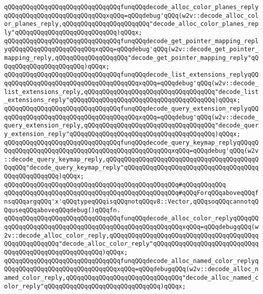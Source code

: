 \verb|qQQqqQQqqQQqqQQqqQQqqQQqqQQqqQQqfunqQQqdecode_alloc_color_planes_replyqQQqqQQqqQQqqQQqqQQqqQQqqQQqxqQQq=qQQqdebug'qQQq(w2v::decode_alloc_color_planes_reply,qQQqqQQqqQQqqQQqqQQqqQQq"decode_alloc_color_planes_reply"qQQqqQQqqQQqqQQqqQQqqQQqqQQq)qQQqx;|\newline
\verb|qQQqqQQqqQQqqQQqqQQqqQQqqQQqqQQqfunqQQqdecode_get_pointer_mapping_replyqQQqqQQqqQQqqQQqqQQqqQQqxqQQq=qQQqdebug'qQQq(w2v::decode_get_pointer_mapping_reply,qQQqqQQqqQQqqQQqqQQq"decode_get_pointer_mapping_reply"qQQqqQQqqQQqqQQqqQQqqQQq)qQQqx;|\newline
\verb|qQQqqQQqqQQqqQQqqQQqqQQqqQQqqQQqfunqQQqdecode_list_extensions_replyqQQqqQQqqQQqqQQqqQQqqQQqqQQqqQQqqQQqqQQqxqQQq=qQQqdebug'qQQq(w2v::decode_list_extensions_reply,qQQqqQQqqQQqqQQqqQQqqQQqqQQqqQQqqQQq"decode_list_extensions_reply"qQQqqQQqqQQqqQQqqQQqqQQqqQQqqQQqqQQqqQQq)qQQqx;|\newline
\verb|qQQqqQQqqQQqqQQqqQQqqQQqqQQqqQQqfunqQQqdecode_query_extension_replyqQQqqQQqqQQqqQQqqQQqqQQqqQQqqQQqqQQqqQQqxqQQq=qQQqdebug'qQQq(w2v::decode_query_extension_reply,qQQqqQQqqQQqqQQqqQQqqQQqqQQqqQQqqQQq"decode_query_extension_reply"qQQqqQQqqQQqqQQqqQQqqQQqqQQqqQQqqQQqqQQq)qQQqx;|\newline
\verb|qQQqqQQqqQQqqQQqqQQqqQQqqQQqqQQqfunqQQqdecode_query_keymap_replyqQQqqQQqqQQqqQQqqQQqqQQqqQQqqQQqqQQqqQQqqQQqqQQqqQQqxqQQq=qQQqdebug'qQQq(w2v::decode_query_keymap_reply,qQQqqQQqqQQqqQQqqQQqqQQqqQQqqQQqqQQqqQQqqQQqqQQq"decode_query_keymap_reply"qQQqqQQqqQQqqQQqqQQqqQQqqQQqqQQqqQQqqQQqqQQqqQQqqQQq)qQQqx;|\newline
\verb|qQQqqQQqqQQqqQQqqQQqqQQqqQQqqQQqqQQqqQQqqQQqqQQq#qQQqqQQqqQQq|\newline
\verb|qQQqqQQqqQQqqQQqqQQqqQQqqQQqqQQqqQQqqQQqqQQqqQQq#qQQqForqQQqaboveqQQqfnsqQQqargqQQq'x'qQQqtypeqQQqisqQQqnotqQQqv8::Vector,qQQqsoqQQqcannotqQQquseqQQqaboveqQQqdebug()qQQqfn.|\newline
\newline
\verb|qQQqqQQqqQQqqQQqqQQqqQQqqQQqqQQqfunqQQqdecode_alloc_color_replyqQQqqQQqqQQqqQQqqQQqqQQqqQQqqQQqqQQqqQQqqQQqqQQqqQQqqQQqxqQQq=qQQqdebugqQQq(w2v::decode_alloc_color_reply,qQQqqQQqqQQqqQQqqQQqqQQqqQQqqQQqqQQqqQQqqQQqqQQqqQQqqQQq"decode_alloc_color_reply"qQQqqQQqqQQqqQQqqQQqqQQqqQQqqQQqqQQqqQQqqQQqqQQqqQQqqQQq)qQQqx;|\newline
\verb|qQQqqQQqqQQqqQQqqQQqqQQqqQQqqQQqfunqQQqdecode_alloc_named_color_replyqQQqqQQqqQQqqQQqqQQqqQQqqQQqqQQqxqQQq=qQQqdebugqQQq(w2v::decode_alloc_named_color_reply,qQQqqQQqqQQqqQQqqQQqqQQqqQQqqQQq"decode_alloc_named_color_reply"qQQqqQQqqQQqqQQqqQQqqQQqqQQqqQQq)qQQqx;|\newline
